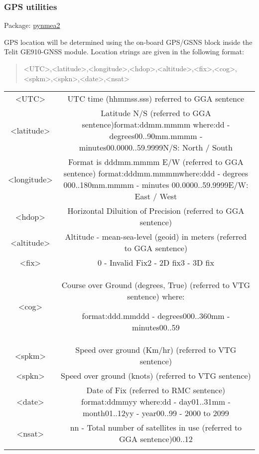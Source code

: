 \subsubsection{GPS utilities}

Package:	\href{https://github.com/Knio/pynmea2}{pynmea2}

GPS location will be determined using the on-board GPS/GSNS block inside the Telit GE910-GNSS module. Location strings are given in the following format:
\begin{quote}
<UTC>,<latitude>,<longitude>,<hdop>,<altitude>,<fix>,<cog>,<spkm>,<spkn>,<date>,<nsat>
\end{quote}

\begin{table} 
    \begin{tabular}{ c c }
        <UTC> & UTC time (hhmmss.sss) referred to GGA sentence \\ 
        <latitude> & Latitude N/S (referred to GGA sentence)format:ddmm.mmmm	where:dd - degrees00..90mm.mmmm - minutes00.0000..59.9999N/S: North / South \\ 
        <longitude> & Format is dddmm.mmmm E/W (referred to GGA sentence) format:dddmm.mmmmwhere:ddd - degrees	000..180mm.mmmm - minutes	00.0000..59.9999E/W: East / West \\ 
        <hdop> & Horizontal Diluition of Precision (referred to GGA sentence) \\ 
        <altitude> & Altitude - mean-sea-level (geoid) in meters (referred to GGA sentence) \\ 
        <fix> & 0 - Invalid Fix2 - 2D fix3 - 3D fix \\ 
        <cog> & Course over Ground (degrees, True) (referred to VTG sentence) where:

format:ddd.mmddd - degrees000..360mm - minutes00..59 \\ 
        <spkm> & Speed over ground (Km/hr) (referred to VTG sentence) \\ 
        <spkn> & Speed over ground (knots) (referred to VTG sentence) \\ 
        <date> & Date of Fix (referred to RMC sentence) format:ddmmyy where:dd - day01..31mm - month01..12yy - year00..99 - 2000 to 2099 \\ 
        <nsat> & nn - Total number of satellites in use (referred to GGA sentence)00..12 \\ 
         &  \\ 
    \end{tabular} 
\end{table}
    
    
    
    
